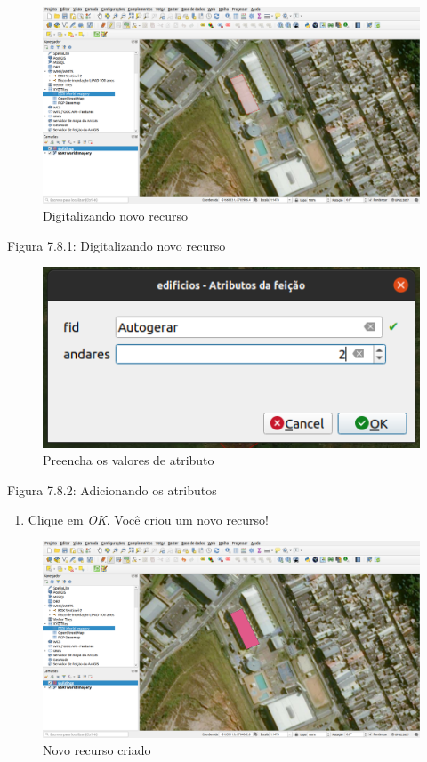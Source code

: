 \documentclass[
  portuguese,
]{krantz}
\providecommand{\tightlist}{%
  \setlength{\itemsep}{0pt}\setlength{\parskip}{0pt}}
\begin{document}
\begin{figure}
\centering
\includegraphics{media/modulo7/digitize-1.png}
\caption{Digitalizando novo recurso}
\end{figure}

Figura 7.8.1: Digitalizando novo recurso

\begin{figure}
\centering
\includegraphics{media/modulo7/digitize-2.png}
\caption{Preencha os valores de atributo}
\end{figure}

Figura 7.8.2: Adicionando os atributos

\begin{enumerate}
\def\labelenumi{\arabic{enumi}.}
\setcounter{enumi}{15}
\tightlist
\item
  Clique em \emph{OK}. Você criou um novo recurso!
\end{enumerate}

\begin{figure}
\centering
\includegraphics{media/modulo7/digitize-3.png}
\caption{Novo recurso criado}
\end{figure}
\end{document}

